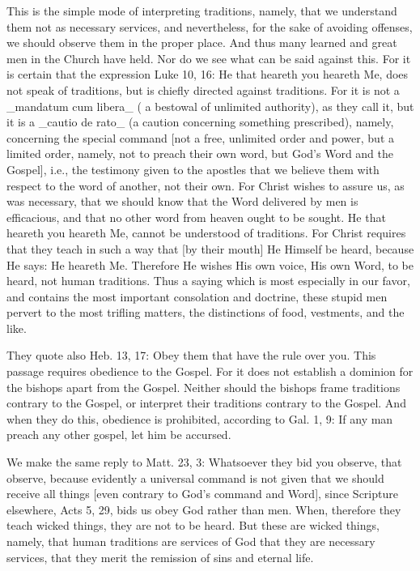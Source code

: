 This is the simple mode of interpreting traditions, namely, that we
understand them not as necessary services, and nevertheless, for the
sake of avoiding offenses, we should observe them in the proper place.
And thus many learned and great men in the Church have held.  Nor
do we see what can be said against this.  For it is certain that the
expression Luke 10, 16: He that heareth you heareth Me, does not
speak of traditions, but is chiefly directed against traditions.  For
it is not a _mandatum cum libera_ ( a bestowal of unlimited
authority), as they call it, but it is a _cautio de rato_ (a caution
concerning something prescribed), namely, concerning the special
command [not a free, unlimited order and power, but a limited order,
namely, not to preach their own word, but God's Word and the Gospel],
i.e., the testimony given to the apostles that we believe them with
respect to the word of another, not their own.  For Christ wishes to
assure us, as was necessary, that we should know that the Word
delivered by men is efficacious, and that no other word from heaven
ought to be sought.  He that heareth you heareth Me, cannot be
understood of traditions.  For Christ requires that they teach in
such a way that [by their mouth] He Himself be heard, because He says:
He heareth Me.  Therefore He wishes His own voice, His own Word, to
be heard, not human traditions.  Thus a saying which is most
especially in our favor, and contains the most important consolation
and doctrine, these stupid men pervert to the most trifling matters,
the distinctions of food, vestments, and the like.

They quote also Heb. 13, 17: Obey them that have the rule over you.
This passage requires obedience to the Gospel.  For it does not
establish a dominion for the bishops apart from the Gospel.  Neither
should the bishops frame traditions contrary to the Gospel, or
interpret their traditions contrary to the Gospel.  And when they do
this, obedience is prohibited, according to Gal. 1, 9: If any man
preach any other gospel, let him be accursed.

We make the same reply to Matt. 23, 3: Whatsoever they bid you
observe, that observe, because evidently a universal command is not
given that we should receive all things [even contrary to God's
command and Word], since Scripture elsewhere, Acts 5, 29, bids us
obey God rather than men.  When, therefore they teach wicked things,
they are not to be heard.  But these are wicked things, namely, that
human traditions are services of God that they are necessary services,
that they merit the remission of sins and eternal life.

